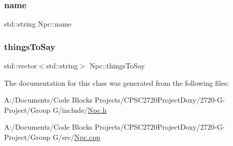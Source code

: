 \subsubsection{\texorpdfstring{name}{name}}
{\footnotesize\ttfamily std\+::string Npc\+::name\hspace{0.3cm}{\ttfamily [protected]}}

\mbox{\label{class_npc_a96b8dbc019c68d7fe8eb377dcb8f9b9f}} 
\subsubsection{\texorpdfstring{things\+To\+Say}{thingsToSay}}
{\footnotesize\ttfamily std\+::vector$<$std\+::string$>$ Npc\+::things\+To\+Say\hspace{0.3cm}{\ttfamily [protected]}}



The documentation for this class was generated from the following files\+:\begin{DoxyCompactItemize}
\item 
A\+:/\+Documents/\+Code Blocks Projects/\+C\+P\+S\+C2720\+Project\+Doxy/2720-\/\+G-\/\+Project/\+Group G/include/\mbox{\hyperlink{_npc_8h}{Npc.\+h}}\item 
A\+:/\+Documents/\+Code Blocks Projects/\+C\+P\+S\+C2720\+Project\+Doxy/2720-\/\+G-\/\+Project/\+Group G/src/\mbox{\hyperlink{_npc_8cpp}{Npc.\+cpp}}\end{DoxyCompactItemize}
